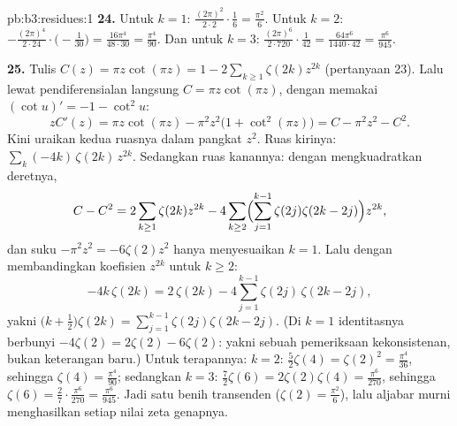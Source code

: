 \begin{solution}{pb:b3:residues:1}
\textbf{24.} Untuk $k = 1$: $\frac{(2\pi)^2}{2\cdot2}\cdot\frac16
= \frac{\pi^2}6$. Untuk $k = 2$: $-\frac{(2\pi)^4}{2\cdot24}
\cdot\bigl(-\frac1{30}\bigr) = \frac{16\pi^4}{48\cdot30} =
\frac{\pi^4}{90}$. Dan untuk $k = 3$: $\frac{(2\pi)^6}{2\cdot720}
\cdot\frac1{42} = \frac{64\pi^6}{1440\cdot42} =
\frac{\pi^6}{945}$.

\textbf{25.} Tulis $C(z) = \pi z\cot(\pi z) = 1 -
2\sum_{k\geq1}\zeta(2k)z^{2k}$ (pertanyaan 23). Lalu lewat pendiferensialan
langsung $C = \pi z\cot(\pi z)$, dengan memakai $(\cot u)'
= -1 - \cot^2u$:
\[
zC'(z) = \pi z\cot(\pi z) - \pi^2z^2\bigl(1 +
\cot^2(\pi z)\bigr) = C - \pi^2z^2 - C^2 .
\]
Kini uraikan kedua ruasnya dalam pangkat $z^2$. Ruas kirinya:
$\sum_k(-4k)\,\zeta(2k)\,z^{2k}$. Sedangkan ruas kanannya: dengan mengkuadratkan
deretnya,
\[
C - C^2 = 2\sum_{k\geq1}\zeta(2k)z^{2k}
- 4\sum_{k\geq2}\Bigl(\sum_{j=1}^{k-1}\zeta(2j)
\zeta(2k-2j)\Bigr)z^{2k},
\]
dan suku $-\pi^2z^2 = -6\zeta(2)z^2$ hanya menyesuaikan $k =
1$. Lalu dengan membandingkan koefisien $z^{2k}$ untuk $k \geq 2$:
\[
-4k\,\zeta(2k) = 2\,\zeta(2k) -
4\sum_{j=1}^{k-1}\zeta(2j)\,\zeta(2k-2j),
\]
yakni $\bigl(k + \frac12\bigr)\zeta(2k) =
\sum_{j=1}^{k-1}\zeta(2j)\zeta(2k-2j)$. (Di $k = 1$
identitasnya berbunyi $-4\zeta(2) = 2\zeta(2) - 6\zeta(2)$: yakni sebuah
pemeriksaan kekonsistenan, bukan keterangan baru.) Untuk terapannya: $k =
2$: $\frac52\zeta(4) = \zeta(2)^2 = \frac{\pi^4}{36}$, sehingga
$\zeta(4) = \frac{\pi^4}{90}$; sedangkan $k = 3$: $\frac72\zeta(6) =
2\zeta(2)\zeta(4) = \frac{\pi^6}{270}$, sehingga $\zeta(6) =
\frac{2}{7}\cdot\frac{\pi^6}{270} = \frac{\pi^6}{945}$. Jadi satu
benih transenden ($\zeta(2) = \frac{\pi^2}6$), lalu aljabar murni
menghasilkan setiap nilai zeta genapnya.

\end{solution}
